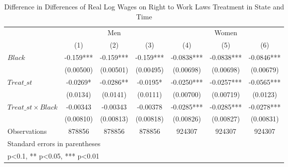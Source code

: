 \begin{table}[htbp]\centering
\def\sym#1{\ifmmode^{#1}\else\(^{#1}\)\fi}
\caption{Difference in Differences of Real Log Wages on Right to Work Laws Treatment in State and Time}
\begin{tabular}{l*{6}{c}}
\hline\hline
                    &\multicolumn{3}{c}{Men}                        &\multicolumn{3}{c}{Women}                      \\\cmidrule(lr){2-4}\cmidrule(lr){5-7}
                    &\multicolumn{1}{c}{(1)}   &\multicolumn{1}{c}{(2)}   &\multicolumn{1}{c}{(3)}   &\multicolumn{1}{c}{(4)}   &\multicolumn{1}{c}{(5)}   &\multicolumn{1}{c}{(6)}   \\
\hline
$ Black $           &      -0.159***&      -0.159***&      -0.159***&     -0.0838***&     -0.0838***&     -0.0846***\\
                    &   (0.00500)   &   (0.00501)   &   (0.00495)   &   (0.00698)   &   (0.00698)   &   (0.00679)   \\
[1em]
$ Treat\_{st} $      &     -0.0269*  &     -0.0286** &     -0.0195*  &     -0.0250***&     -0.0257***&     -0.0565***\\
                    &    (0.0134)   &    (0.0141)   &    (0.0111)   &   (0.00700)   &   (0.00719)   &    (0.0123)   \\
[1em]
$ Treat\_{st} \times Black $&    -0.00343   &    -0.00343   &    -0.00378   &     -0.0285***&     -0.0285***&     -0.0278***\\
                    &   (0.00810)   &   (0.00813)   &   (0.00818)   &   (0.00826)   &   (0.00827)   &   (0.00831)   \\
\hline
Observations        &      878856   &      878856   &      878856   &      924307   &      924307   &      924307   \\
\hline\hline
\multicolumn{7}{l}{\footnotesize Standard errors in parentheses}\\
\multicolumn{7}{l}{\footnotesize * p<0.1, ** p<0.05, *** p<0.01}\\
\end{tabular}
\end{table}
